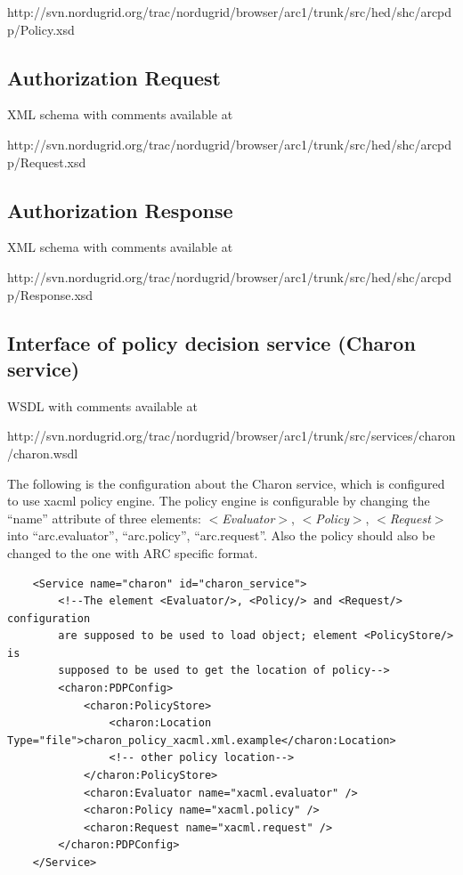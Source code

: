 \documentclass{article}                            %
\begin{document}
http://svn.nordugrid.org/trac/nordugrid/browser/arc1/trunk/src/hed/shc/arcpdp/Policy.xsd

\subsection{Authorization Request} %
\label{subsec:authz_request}
XML schema with comments available at 

http://svn.nordugrid.org/trac/nordugrid/browser/arc1/trunk/src/hed/shc/arcpdp/Request.xsd


\subsection{Authorization Response} %
\label{subsec:authz_response}
XML schema with comments available at 

http://svn.nordugrid.org/trac/nordugrid/browser/arc1/trunk/src/hed/shc/arcpdp/Response.xsd


\subsection{Interface of policy decision service (Charon service)} %
\label{subsec:interface_pds}
WSDL with comments available at 

http://svn.nordugrid.org/trac/nordugrid/browser/arc1/trunk/src/services/charon/charon.wsdl

The following is the configuration about the Charon service, which is configured to use xacml policy engine. The policy engine is configurable by changing the ``name'' attribute of three elements: \textit{$<$Evaluator$>$}, \textit{$<$Policy$>$}, \textit{$<$Request$>$} into ``arc.evaluator'', ``arc.policy'', ``arc.request''. Also the policy should also be changed to the one with ARC specific format.

\begin{verbatim}
    <Service name="charon" id="charon_service">
        <!--The element <Evaluator/>, <Policy/> and <Request/> configuration
        are supposed to be used to load object; element <PolicyStore/> is
        supposed to be used to get the location of policy-->
        <charon:PDPConfig>
            <charon:PolicyStore>
                <charon:Location Type="file">charon_policy_xacml.xml.example</charon:Location>
                <!-- other policy location-->
            </charon:PolicyStore>
            <charon:Evaluator name="xacml.evaluator" />
            <charon:Policy name="xacml.policy" />
            <charon:Request name="xacml.request" />
        </charon:PDPConfig>
    </Service>
\end{verbatim}
\end{document}
